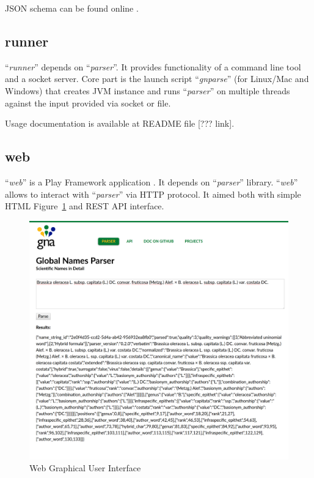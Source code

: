 \documentclass{bmcart}
\begin{document}
JSON schema can be found online \cite{gnparser-json}.

\subsection*{runner}

``\textit{runner}'' depends on ``\textit{parser}''. It provides functionality
of a command line tool and a socket server. Core part is the launch script
``\textit{gnparse}'' (for Linux/Mac and Windows) that creates JVM
instance and runs ``\textit{parser}'' on multiple threads against the input
provided via socket or file.

Usage documentation is available at README file [??? link].

\subsection*{web}

``\textit{web}'' is a Play Framework application \cite{wampler2011scala}. It
depends on ``\textit{parser}'' library. ``\textit{web}'' allows to interact
with ``\textit{parser}'' via HTTP protocol. It aimed both with simple HTML
Figure~\ref{figure:webgui} and REST API interface.

\begin{figure}[htbp]
  \begin{center}
    \caption{
      Web Graphical User Interface
    }\label{figure:webgui}
    \vspace{5mm}

    \includegraphics[scale=0.175]{images/web_gui.png}
  \end{center}
\end{figure}
\end{document}
